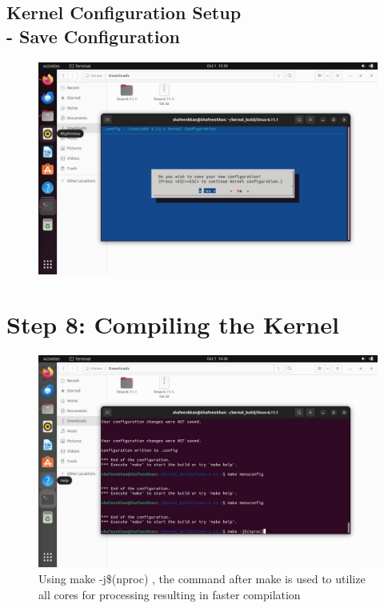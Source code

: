 \documentclass{article}
\begin{document}
\subsection{Kernel Configuration Setup \\-  Save Configuration}
\begin{figure}[H]
    \centering
    \includegraphics[width=0.8\linewidth]{43.jpg}
    \caption{}
\end{figure}

\section*{Step 8: Compiling the Kernel}
\begin{figure}[H]
    \centering
    \includegraphics[width=0.8\linewidth]{26.jpg}
    \caption{Using make -j\$(nproc) , the command after make is used to utilize all cores for processing resulting in faster compilation}
\end{figure}
\end{document}
